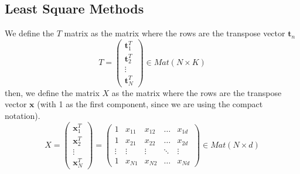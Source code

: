 \documentclass[10pt, letterpaper]{report}
\begin{document}
\subsection{Least Square Methods}
We define the $T$ matrix as the matrix where the rows are the transpose vector $\mathbf t_n$\begin{equation}
	T=\begin{pmatrix}
		\mathbf t^T_1 \\
		\mathbf t^T_2 \\ \vdots \\
		\mathbf t^T_N
	\end{pmatrix}\in Mat(N\times K)
\end{equation}
then, we define  the matrix $X$ as the matrix where the rows are the transpose vector $\mathbf x$ (with 1 as the first component, since we are using the compact notation).\begin{equation}
	X=\begin{pmatrix}
		\mathbf x_1^T \\
		\mathbf x_2^T \\ \vdots \\
		\mathbf x_N^T
	\end{pmatrix}=\begin{pmatrix}
		1      & x_{11} & x_{12} & \dots  & x_{1d} \\
		1      & x_{21} & x_{22} & \dots  & x_{2d} \\
		\vdots & \vdots & \vdots & \ddots & \vdots \\
		1      & x_{N1} & x_{N2} & \dots  & x_{Nd}
	\end{pmatrix}\in Mat(N\times d)
\end{equation}
\end{document}
